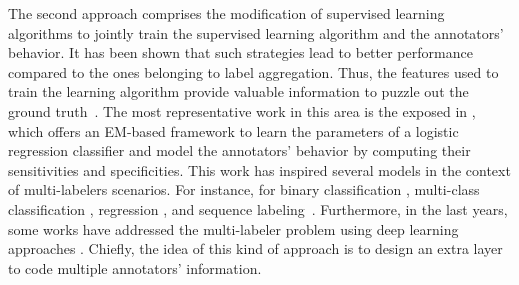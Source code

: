 \documentclass[journal]{IEEEtran}
\begin{document}
The second approach comprises the modification of supervised learning algorithms to jointly train the supervised learning algorithm and the annotators' behavior. It has been shown that such strategies lead to better performance compared to the ones belonging to label aggregation. Thus, the features used to train the learning algorithm provide valuable information to puzzle out the ground truth~\cite{ruiz2019learning}. The most representative work in this area is the exposed in \cite{raykar2010learning}, which offers an EM-based framework to learn the parameters of a logistic regression classifier and model the annotators' behavior by computing their sensitivities and specificities. This work has inspired several models in the context of multi-labelers scenarios. For instance, for binary classification \cite{rodrigues2014gaussian,ruiz2019learning}, multi-class classification \cite{morales2019scalable,gonzalez2015automatic}, regression \cite{groot2011learning,rodrigues2017learning}, and sequence labeling~\cite{rodrigues2014sequence}. Furthermore, in the last years, some works have addressed the multi-labeler problem using deep learning approaches \cite{albarqouni2016aggnet,rodrigues2018deep,guan2018said}. Chiefly, the idea of this kind of approach is to design an extra layer to code multiple annotators' information. 
\end{document}
